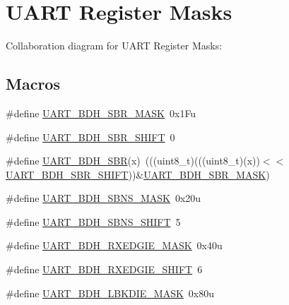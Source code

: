 \hypertarget{group___u_a_r_t___register___masks}{}\section{U\+A\+RT Register Masks}
\label{group___u_a_r_t___register___masks}
Collaboration diagram for U\+A\+RT Register Masks\+:
\subsection*{Macros}
\begin{DoxyCompactItemize}
\item 
\#define \hyperlink{group___u_a_r_t___register___masks_ga2680dc8176b0c933b4a1b77c5dbb64b7}{U\+A\+R\+T\+\_\+\+B\+D\+H\+\_\+\+S\+B\+R\+\_\+\+M\+A\+SK}~0x1\+Fu
\item 
\#define \hyperlink{group___u_a_r_t___register___masks_gac38d8a98be282d97c4837597a6c02cda}{U\+A\+R\+T\+\_\+\+B\+D\+H\+\_\+\+S\+B\+R\+\_\+\+S\+H\+I\+FT}~0
\item 
\#define \hyperlink{group___u_a_r_t___register___masks_ga7d337242135cdbd812b7da47758fbdb6}{U\+A\+R\+T\+\_\+\+B\+D\+H\+\_\+\+S\+BR}(x)~(((uint8\+\_\+t)(((uint8\+\_\+t)(x))$<$$<$\hyperlink{group___u_a_r_t___register___masks_gac38d8a98be282d97c4837597a6c02cda}{U\+A\+R\+T\+\_\+\+B\+D\+H\+\_\+\+S\+B\+R\+\_\+\+S\+H\+I\+FT}))\&\hyperlink{group___u_a_r_t___register___masks_ga2680dc8176b0c933b4a1b77c5dbb64b7}{U\+A\+R\+T\+\_\+\+B\+D\+H\+\_\+\+S\+B\+R\+\_\+\+M\+A\+SK})
\item 
\#define \hyperlink{group___u_a_r_t___register___masks_ga727c0ef3199f627c85fc740265d5134d}{U\+A\+R\+T\+\_\+\+B\+D\+H\+\_\+\+S\+B\+N\+S\+\_\+\+M\+A\+SK}~0x20u
\item 
\#define \hyperlink{group___u_a_r_t___register___masks_ga4d6023b67150b98ef12dba445f773109}{U\+A\+R\+T\+\_\+\+B\+D\+H\+\_\+\+S\+B\+N\+S\+\_\+\+S\+H\+I\+FT}~5
\item 
\#define \hyperlink{group___u_a_r_t___register___masks_ga0882debd8f2c52d4ab8461b22b6519d9}{U\+A\+R\+T\+\_\+\+B\+D\+H\+\_\+\+R\+X\+E\+D\+G\+I\+E\+\_\+\+M\+A\+SK}~0x40u
\item 
\#define \hyperlink{group___u_a_r_t___register___masks_ga97c5d15ae3144492e364744236aa10f7}{U\+A\+R\+T\+\_\+\+B\+D\+H\+\_\+\+R\+X\+E\+D\+G\+I\+E\+\_\+\+S\+H\+I\+FT}~6
\item 
\#define \hyperlink{group___u_a_r_t___register___masks_ga88fb29d1cb045a09e851a31c689ef60e}{U\+A\+R\+T\+\_\+\+B\+D\+H\+\_\+\+L\+B\+K\+D\+I\+E\+\_\+\+M\+A\+SK}~0x80u
$$
\end{DoxyCompactItemize}
